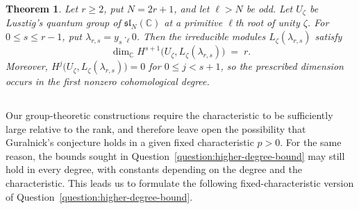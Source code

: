 \documentclass[11pt,a4paper,reqno]{amsart}
\numberwithin{equation}{section}
\newtheorem{maintheorem}{Theorem}
\newtheorem{question}{Question}
\theoremstyle{definition}
\theoremstyle{remark}
\theoremstyle{plain}
\begin{document}
\begin{maintheorem}
\label{thm:D}
\label{thm:quantum}
Let $r\ge2$, put $N=2r+1$, and let $\ell>N$ be odd.
Let $U_\zeta$ be Lusztig's quantum group of $\mathfrak{sl}_N(\mathbb C)$
at a primitive $\ell$th root of unity $\zeta$.
For $0\le s\le r-1$, put $\lambda_{r,s}=y_s\cdot_\ell0$.
Then the irreducible modules $L_\zeta(\lambda_{r,s})$ satisfy
\[
\dim_{\mathbb C}
H^{s+1}\big(U_\zeta,L_\zeta(\lambda_{r,s})\big)\;=\;r.
\]
Moreover, $H^j\big(U_\zeta,L_\zeta(\lambda_{r,s})\big)=0$ for
$0\le j<s+1$, so the prescribed dimension occurs in the first
nonzero cohomological degree.
\end{maintheorem}



\subsection{} 
Our group-theoretic constructions require  the characteristic to be sufficiently large
relative to the rank, and therefore leave  open the possibility that
Guralnick's conjecture holds in a given fixed characteristic $p>0$. 
For the same reason, the bounds sought in
Question~\ref{question:higher-degree-bound} may still hold in every
degree, with constants depending on the degree and the characteristic.
This leads us to formulate the following fixed-characteristic version of
Question~\ref{question:higher-degree-bound}.
 

\end{document}
